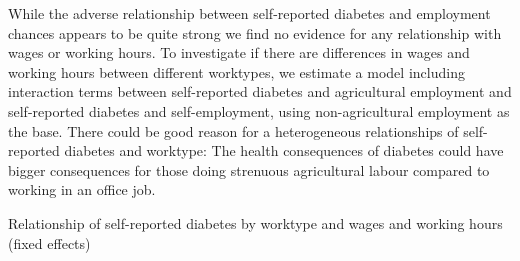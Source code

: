 While the adverse relationship between self-reported diabetes and
employment chances appears to be quite strong we find no evidence
for any relationship with wages or working hours. To investigate if
there are differences in wages and working hours between different
worktypes, we estimate a model including interaction terms between
self-reported diabetes and agricultural employment and self-reported
diabetes and self-employment, using non-agricultural employment as
the base. There could be good reason for a heterogeneous relationships
of self-reported diabetes and worktype: The health consequences of
diabetes could have bigger consequences for those doing strenuous
agricultural labour compared to working in an office job.   

\begin{table}[H]
\caption{\label{tab:Self-reported-diabetes-interaction}Relationship of self-reported
diabetes by worktype and wages and working hours (fixed effects)}



\end{table}
